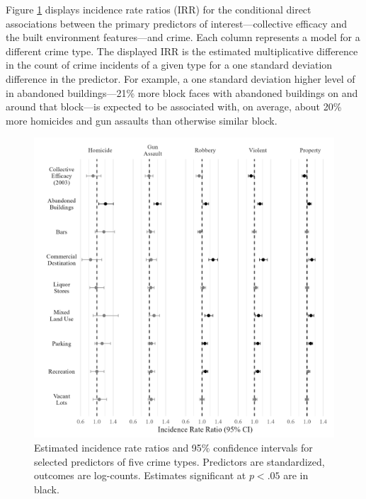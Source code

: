 \documentclass [11pt, proquest] {uwthesis}[2015/03/03]
\begin{document}
Figure \ref{fig:coefplot} displays incidence rate ratios (IRR) for the conditional direct associations between the primary predictors of interest---collective efficacy and the built environment features---and crime. Each column represents a model for a different crime type. The displayed IRR is the estimated multiplicative difference in the count of crime incidents of a given type for a one standard deviation difference in the predictor. For example, a one standard deviation higher level of in abandoned buildings---21\% more block faces with abandoned buildings on and around that block---is expected to be associated with, on average, about 20\% more homicides and gun assaults than otherwise similar block.
\begin{figure}

{\centering \includegraphics[width=1\linewidth]{./figure/ch2/coefplot_stage_2} 

}

\caption[Estimated incidence rate ratios and 95\% confidence intervals for selected predictors of five crime types.]{Estimated incidence rate ratios and 95\% confidence intervals for selected predictors of five crime types. Predictors are standardized, outcomes are log-counts. Estimates significant at $p < .05$ are in black.}\label{fig:coefplot}
\end{figure}
\end{document}
